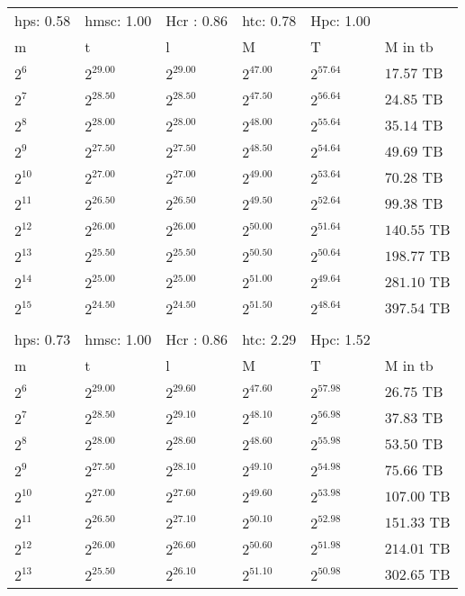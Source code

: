\begin{tabular}{llllll}
hps: 0.58 & hmsc: 1.00 & Hcr : 0.86 & htc: 0.78 & Hpc: 1.00 &  \\
m & t & l & M & T & M in tb \\
$2^{6}$ & $2^{29.00}$ & $2^{29.00}$ & $2^{47.00}$ & $2^{57.64}$ & $17.57$ TB \\
$2^{7}$ & $2^{28.50}$ & $2^{28.50}$ & $2^{47.50}$ & $2^{56.64}$ & $24.85$ TB \\
$2^{8}$ & $2^{28.00}$ & $2^{28.00}$ & $2^{48.00}$ & $2^{55.64}$ & $35.14$ TB \\
$2^{9}$ & $2^{27.50}$ & $2^{27.50}$ & $2^{48.50}$ & $2^{54.64}$ & $49.69$ TB \\
$2^{10}$ & $2^{27.00}$ & $2^{27.00}$ & $2^{49.00}$ & $2^{53.64}$ & $70.28$ TB \\
$2^{11}$ & $2^{26.50}$ & $2^{26.50}$ & $2^{49.50}$ & $2^{52.64}$ & $99.38$ TB \\
$2^{12}$ & $2^{26.00}$ & $2^{26.00}$ & $2^{50.00}$ & $2^{51.64}$ & $140.55$ TB \\
$2^{13}$ & $2^{25.50}$ & $2^{25.50}$ & $2^{50.50}$ & $2^{50.64}$ & $198.77$ TB \\
$2^{14}$ & $2^{25.00}$ & $2^{25.00}$ & $2^{51.00}$ & $2^{49.64}$ & $281.10$ TB \\
$2^{15}$ & $2^{24.50}$ & $2^{24.50}$ & $2^{51.50}$ & $2^{48.64}$ & $397.54$ TB \\
 &  &  &  &  &  \\
hps: 0.73 & hmsc: 1.00 & Hcr : 0.86 & htc: 2.29 & Hpc: 1.52 &  \\
m & t & l & M & T & M in tb \\
$2^{6}$ & $2^{29.00}$ & $2^{29.60}$ & $2^{47.60}$ & $2^{57.98}$ & $26.75$ TB \\
$2^{7}$ & $2^{28.50}$ & $2^{29.10}$ & $2^{48.10}$ & $2^{56.98}$ & $37.83$ TB \\
$2^{8}$ & $2^{28.00}$ & $2^{28.60}$ & $2^{48.60}$ & $2^{55.98}$ & $53.50$ TB \\
$2^{9}$ & $2^{27.50}$ & $2^{28.10}$ & $2^{49.10}$ & $2^{54.98}$ & $75.66$ TB \\
$2^{10}$ & $2^{27.00}$ & $2^{27.60}$ & $2^{49.60}$ & $2^{53.98}$ & $107.00$ TB \\
$2^{11}$ & $2^{26.50}$ & $2^{27.10}$ & $2^{50.10}$ & $2^{52.98}$ & $151.33$ TB \\
$2^{12}$ & $2^{26.00}$ & $2^{26.60}$ & $2^{50.60}$ & $2^{51.98}$ & $214.01$ TB \\
$2^{13}$ & $2^{25.50}$ & $2^{26.10}$ & $2^{51.10}$ & $2^{50.98}$ & $302.65$ TB \\

\end{tabular}
